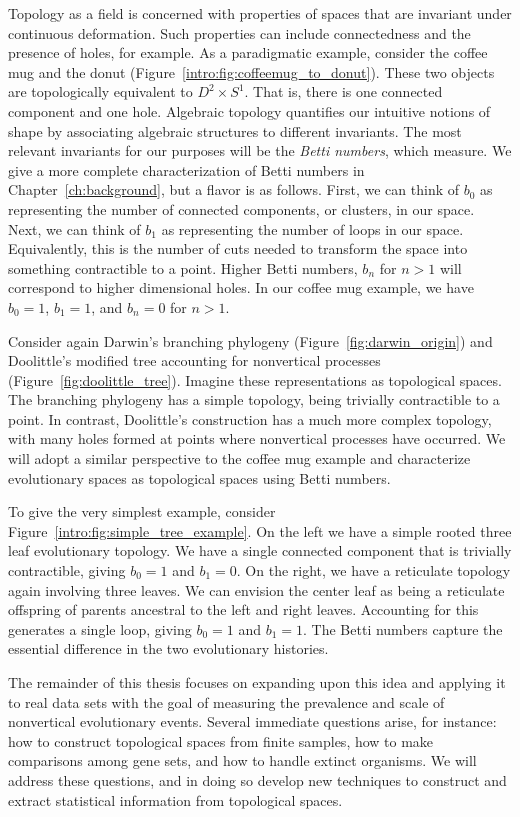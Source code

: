Topology as a field is concerned with properties of spaces that are invariant under continuous deformation.
Such properties can include connectedness and the presence of holes, for example.
As a paradigmatic example, consider the coffee mug and the donut (Figure~\ref{intro:fig:coffeemug_to_donut}).
These two objects are topologically equivalent to $D^2\times S^1$.
That is, there is one connected component and one hole.
Algebraic topology quantifies our intuitive notions of shape by associating algebraic structures to different invariants.
The most relevant invariants for our purposes will be the \emph{Betti numbers}, which measure.
We give a more complete characterization of Betti numbers in Chapter~\ref{ch:background}, but a flavor is as follows.
First, we can think of $b_0$ as representing the number of connected components, or clusters, in our space.
Next, we can think of $b_1$ as representing the number of loops in our space.
Equivalently, this is the number of cuts needed to transform the space into something contractible to a point.
Higher Betti numbers, $b_n$ for $n>1$ will correspond to higher dimensional holes.
In our coffee mug example, we have $b_0=1$, $b_1=1$, and $b_n=0$ for $n>1$.

Consider again Darwin's branching phylogeny (Figure~\ref{fig:darwin_origin}) and Doolittle's modified tree accounting for nonvertical processes (Figure~\ref{fig:doolittle_tree}).
Imagine these representations as topological spaces.
The branching phylogeny has a simple topology, being trivially contractible to a point.
In contrast, Doolittle's construction has a much more complex topology, with many holes formed at points where nonvertical processes have occurred.
We will adopt a similar perspective to the coffee mug example and characterize evolutionary spaces as topological spaces using Betti numbers.

To give the very simplest example, consider Figure~\ref{intro:fig:simple_tree_example}.
On the left we have a simple rooted three leaf evolutionary topology.
We have a single connected component that is trivially contractible, giving $b_0=1$ and $b_1=0$.
On the right, we have a reticulate topology again involving three leaves.
We can envision the center leaf as being a reticulate offspring of parents ancestral to the left and right leaves.
Accounting for this generates a single loop, giving $b_0=1$ and $b_1=1$.
The Betti numbers capture the essential difference in the two evolutionary histories.

The remainder of this thesis focuses on expanding upon this idea and applying it to real data sets with the goal of measuring the prevalence and scale of nonvertical evolutionary events.
Several immediate questions arise, for instance: how to construct topological spaces from finite samples, how to make comparisons among gene sets, and how to handle extinct organisms.
We will address these questions, and in doing so develop new techniques to construct and extract statistical information from topological spaces.

